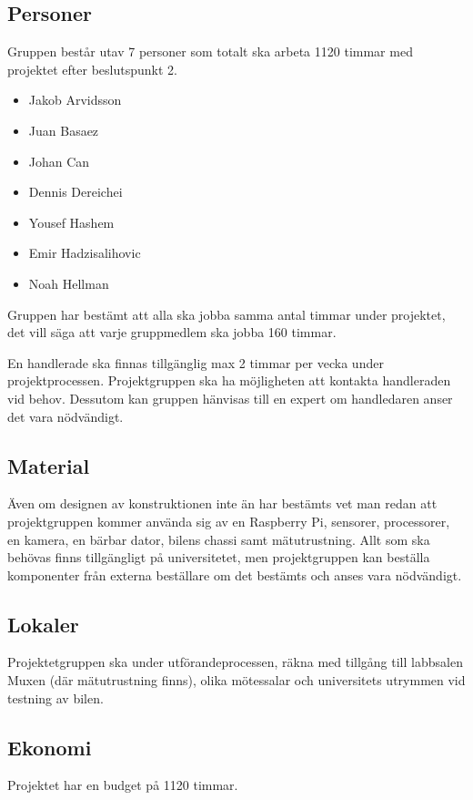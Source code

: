 \documentclass[projektplan/plan.tex]{subfiles}
\begin{document}
\subsection{Personer}
Gruppen består utav 7 personer som totalt ska arbeta 1120 timmar med projektet
efter beslutspunkt 2.

\begin{itemize}
    \item Jakob Arvidsson
    \item Juan Basaez
    \item Johan Can
    \item Dennis Dereichei
    \item Yousef Hashem
    \item Emir Hadzisalihovic
    \item Noah Hellman

\end{itemize}
Gruppen har bestämt att alla ska jobba samma antal timmar under projektet, det
vill säga att varje gruppmedlem ska jobba 160 timmar.

En handlerade ska finnas tillgänglig max 2 timmar per vecka under projektprocessen.
Projektgruppen ska ha möjligheten att kontakta handleraden vid behov.
Dessutom kan gruppen hänvisas till en expert om handledaren anser det vara
nödvändigt.

\subsection{Material}
Även om designen av konstruktionen inte än har bestämts vet man redan att
projektgruppen kommer använda sig av en Raspberry Pi, sensorer, processorer, en
kamera, en bärbar dator, bilens chassi samt mätutrustning. Allt som ska
behövas finns tillgängligt på universitetet, men projektgruppen kan beställa
komponenter från externa beställare om det bestämts och anses vara nödvändigt.

\subsection{Lokaler}
Projektetgruppen ska under utförandeprocessen, räkna med tillgång till
labbsalen Muxen (där mätutrustning finns), olika mötessalar och universitets
utrymmen vid testning av bilen.

\subsection{Ekonomi}
Projektet har en budget på 1120 timmar.
\end{document}
